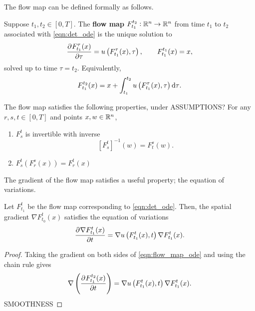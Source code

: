 The flow map can be defined formally as follows.
\begin{definition}
	Suppose \(t_1, t_2 \in [0,T]\).
	The \textbf{flow map} \(F_{t_1}^{t_2}: \mathbb{R}^n \to \mathbb{R}^n\) from time \(t_1\) to \(t_2\) associated with \eqref{eqn:det_ode} is the unique solution to
	\begin{equation}
		\dpd{F_{t_1}^{\tau}(x)}{\tau} = u\left(F_{t_1}^\tau(x), \tau\right), \qquad F_{t_1}^{t_1}(x) = x,
		\label{eqn:flow_map_ode}
	\end{equation}
	solved up to time \(\tau = t_2\).
	Equivalently,
	\[
		F_{t_1}^{t_2}(x) = x + \int_{t_1}^{t_2}{u\left(F_{t_1}^\tau(x), \tau\right)\dif\tau}.
	\]
\end{definition}
The flow map satisfies the following properties, under ASSUMPTIONS?
For any \(r, s, t \in [0,T]\) and points \(x,w \in \mathbb{R}^n\),
\begin{enumerate}
	\item \(F_{s}^{t}\) is invertible with inverse
	      \[
		      \left[F_{s}^{t}\right]^{-1}\left(w\right) = F_{t}^{s}\left(w\right).
	      \]
	\item \(F_s^{t}\left(F_{r}^{s}(x)\right) = F_{r}^{t}\left(x\right)\)
\end{enumerate}

The gradient of the flow map satisfies a useful property; the equation of variations.
\begin{theorem}
	Let \(F_{t_1}^{t}\) be the flow map corresponding to \eqref{eqn:det_ode}.
	Then, the spatial gradient \(\nabla F_{t_0}^t(x)\) satisfies the equation of variations
	\begin{equation}
		\dpd{\nabla F_{t_1}^{t}(x)}{t} = \nabla u\left(F_{t_1}^{t}(x), t\right) \nabla F_{t_1}^{t}(x).
		\label{eqn:eqn_of_variations}
	\end{equation}
\end{theorem}
\begin{proof}
	Taking the gradient on both sides of \eqref{eqn:flow_map_ode} and using the chain rule gives
	\[
		\nabla\left(\dpd{F_{t_1}^{t_2}(x)}{t}\right) = \nabla u\left(F_{t_1}^{t}(x), t\right) \nabla F_{t_1}^{t}(x).
	\]
	SMOOTHNESS
\end{proof}



